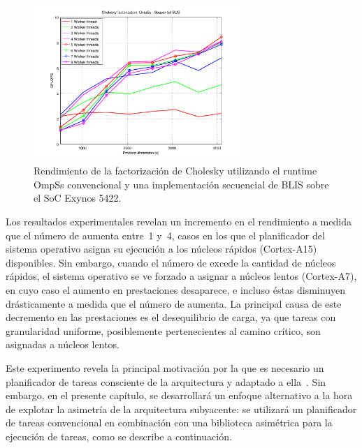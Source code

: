 \begin{figure}
\centering
\includegraphics[width=0.70\textwidth]{Plots/Orig_runtime/plot_1to8_th}
\caption{Rendimiento de la factorización de Cholesky utilizando el runtime OmpSs convencional y una implementación secuencial
	de BLIS sobre el SoC Exynos 5422.}
\label{fig:ompss_blis_oversubscription}
\end{figure}


Los resultados experimentales revelan un incremento en el rendimiento a medida que el número de \wts aumenta entre~1 y~4,
casos en los que el planificador del sistema operativo asigna su ejecución a los núcleos rápidos (Cortex-A15) disponibles.
Sin embargo, cuando el número de \wts excede la cantidad de núcleos rápidos, el sistema operativo se ve forzado a asignar
\wts a núcleos lentos (Cortex-A7), en cuyo caso el aumento en prestaciones desaparece, e incluso éstas disminuyen drásticamente 
a medida que el número de \wts aumenta. La principal causa de este decremento en las prestaciones es el desequilibrio de carga,
ya que tareas con granularidad uniforme, posiblemente pertenecientes al camino crítico, son asignadas a núcleos lentos.

Este experimento revela la principal motivación por la que es necesario un planificador de tareas consciente de la
arquitectura y adaptado a ella~\cite{OmpSsbigLITTLE}. Sin embargo, en el presente capítulo, se desarrollará un enfoque alternativo
a la hora de explotar la asimetría de la arquitectura subyacente: se utilizará un planificador de tareas convencional en combinación
con una biblioteca asimétrica para la ejecución de tareas, como se describe a continuación.

